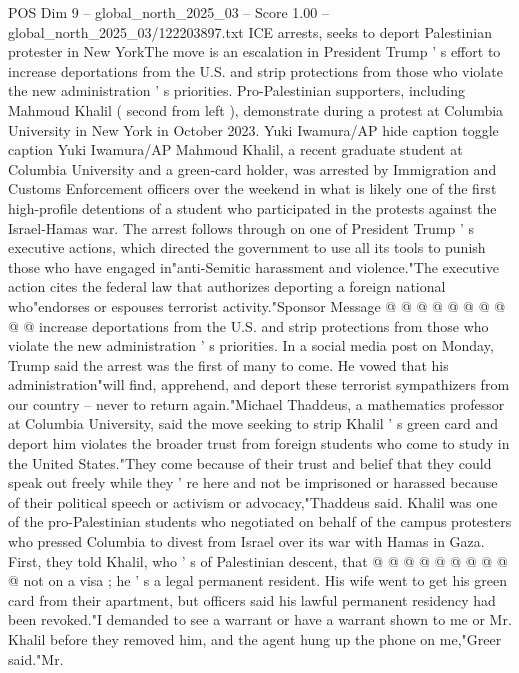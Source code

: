 \begin{textsample}{POS Dim 9 – global\_north\_2025\_03 – Score 1.00 – global\_north\_2025\_03/122203897.txt}  \label{ex:f9_pos_300}
ICE arrests, seeks to deport Palestinian protester in New YorkThe move is an escalation in President Trump ' s effort to increase deportations from the U.S. and strip protections from those who violate the new administration ' s priorities.
Pro-Palestinian supporters, including Mahmoud Khalil ( second from left ), demonstrate during a protest at Columbia University in New York in October 2023.
Yuki Iwamura/AP hide caption toggle caption Yuki Iwamura/AP Mahmoud Khalil, a recent graduate student at Columbia University and a green-card holder, was arrested by Immigration and Customs Enforcement officers over the weekend in what is likely one of the first high-profile detentions of a student who participated in the protests against the Israel-Hamas war.
The arrest follows through on one of President Trump ' s executive actions, which directed the government to use all its tools to punish those who have engaged in"anti-Semitic harassment and violence."The executive action cites the federal law that authorizes deporting a foreign national who"endorses or espouses terrorist activity."Sponsor Message @ @ @ @ @ @ @ @ @ @ increase deportations from the U.S. and strip protections from those who violate the new administration ' s priorities.
In a social media post on Monday, Trump said the arrest was the first of many to come.
He vowed that his administration"will find, apprehend, and deport these terrorist sympathizers from our country -- never to return again."Michael Thaddeus, a mathematics professor at Columbia University, said the move seeking to strip Khalil ' s green card and deport him violates the broader trust from foreign students who come to study in the United States."They come because of their trust and belief that they could speak out freely while they ' re here and not be imprisoned or harassed because of their political speech or activism or advocacy,"Thaddeus said.
Khalil was one of the pro-Palestinian students who negotiated on behalf of the campus protesters who pressed Columbia to divest from Israel over its war with Hamas in Gaza.
First, they told Khalil, who ' s of Palestinian descent, that @ @ @ @ @ @ @ @ @ @ not on a visa ; he ' s a legal permanent resident.
His wife went to get his green card from their apartment, but officers said his lawful permanent residency had been revoked."I demanded to see a warrant or have a warrant shown to me or Mr.
Khalil before they removed him, and the agent hung up the phone on me,"Greer said."Mr.

\end{textsample}
